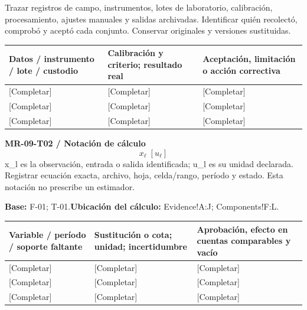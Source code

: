 Trazar registros de campo, instrumentos, lotes de laboratorio, calibración, procesamiento, ajustes manuales y salidas archivadas. Identificar quién recolectó, comprobó y aceptó cada conjunto. Conservar originales y versiones sustituidas.\par
{}
{\sffamily\fontsize{8.6}{10.7}\selectfont\begin{longtable}{@{}P{48mm}P{61mm}P{53mm}@{}}
\toprule
\textbf{Datos / instrumento / lote / custodio} & \textbf{Calibración y criterio; resultado real} & \textbf{Aceptación, limitación o acción correctiva}\\\midrule\endhead
\rule{0pt}{8mm}[Completar] & [Completar] & [Completar]\\\hline
\rule{0pt}{8mm}[Completar] & [Completar] & [Completar]\\\hline
\rule{0pt}{8mm}[Completar] & [Completar] & [Completar]\\\hline
\end{longtable}}
\par\begingroup\sffamily\fontsize{8.4}{10.5}\selectfont\color{NEBGreen}
\textbf{MR-09-T02 / Notación de cálculo}\
{\fontsize{10}{12}\selectfont\[x_{\ell}\;[u_{\ell}]\]}
x\_l es la observación, entrada o salida identificada; u\_l es su unidad declarada. Registrar ecuación exacta, archivo, hoja, celda/rango, período y estado. Esta notación no prescribe un estimador.\par
\textbf{Base:} F-01; T-01.\quad\textbf{Ubicación del cálculo:} Evidence!A:J; Components!F:L.\par\endgroup
{\sffamily\fontsize{8.6}{10.7}\selectfont\begin{longtable}{@{}P{48mm}P{61mm}P{53mm}@{}}
\toprule
\textbf{Variable / período / soporte faltante} & \textbf{Sustitución o cota; unidad; incertidumbre} & \textbf{Aprobación, efecto en cuentas comparables y vacío}\\\midrule\endhead
\rule{0pt}{8mm}[Completar] & [Completar] & [Completar]\\\hline
\rule{0pt}{8mm}[Completar] & [Completar] & [Completar]\\\hline
\rule{0pt}{8mm}[Completar] & [Completar] & [Completar]\\\hline
\end{longtable}}
